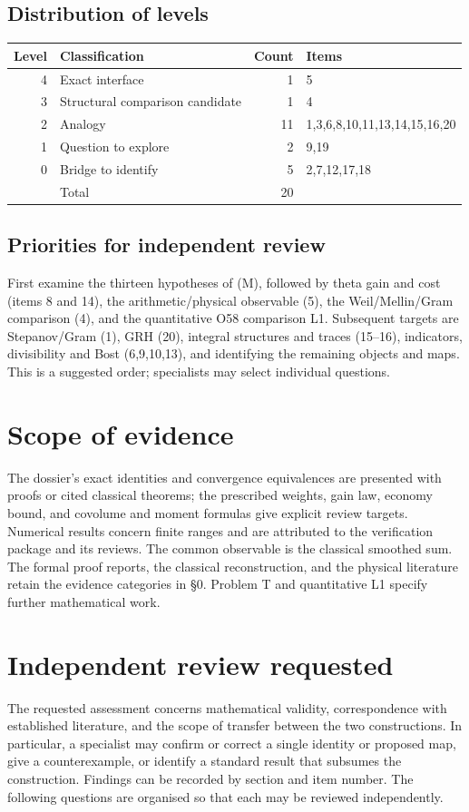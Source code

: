 \documentclass[11pt,a4paper]{article}
\begin{document}
\subsection{Distribution of levels}
\begin{center}\small\begin{tabular}{@{}rlrl@{}}\toprule
Level&Classification&Count&Items\\\midrule
4&Exact interface&1&5\\3&Structural comparison candidate&1&4\\2&Analogy&11&1,3,6,8,10,11,13,14,15,16,20\\1&Question to explore&2&9,19\\0&Bridge to identify&5&2,7,12,17,18\\\midrule
&Total&20&\\\bottomrule\end{tabular}\end{center}
\subsection{Priorities for independent review}
First examine the thirteen hypotheses of (M), followed by theta gain and cost (items 8 and 14), the arithmetic/physical observable (5), the Weil/Mellin/Gram comparison (4), and the quantitative O58 comparison L1. Subsequent targets are Stepanov/Gram (1), GRH (20), integral structures and traces (15--16), indicators, divisibility and Bost (6,9,10,13), and identifying the remaining objects and maps. This is a suggested order; specialists may select individual questions.
\section{Scope of evidence}
The dossier's exact identities and convergence equivalences are presented with proofs or cited classical theorems; the prescribed weights, gain law, economy bound, and covolume and moment formulas give explicit review targets. Numerical results concern finite ranges and are attributed to the verification package and its reviews. The common observable is the classical smoothed sum. The formal proof reports, the classical reconstruction, and the physical literature retain the evidence categories in §0. Problem T and quantitative L1 specify further mathematical work.
\section{Independent review requested}
The requested assessment concerns mathematical validity, correspondence with established literature, and the scope of transfer between the two constructions. In particular, a specialist may confirm or correct a single identity or proposed map, give a counterexample, or identify a standard result that subsumes the construction. Findings can be recorded by section and item number. The following questions are organised so that each may be reviewed independently.
\end{document}
